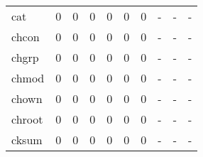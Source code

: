 \begin{longtable}{lp{1.3cm}p{1.3cm}p{1.3cm}p{1.3cm}p{1.3cm}p{1.3cm}p{1.3cm}p{1.3cm}p{1.3cm}}
cat       &                      0 &                                             0 &                                            0 &                                           0 &                                            0 &                                          0 &                                    - &                                      - &                                    - \\
chcon     &                      0 &                                             0 &                                            0 &                                           0 &                                            0 &                                          0 &                                    - &                                      - &                                    - \\
chgrp     &                      0 &                                             0 &                                            0 &                                           0 &                                            0 &                                          0 &                                    - &                                      - &                                    - \\
chmod     &                      0 &                                             0 &                                            0 &                                           0 &                                            0 &                                          0 &                                    - &                                      - &                                    - \\
chown     &                      0 &                                             0 &                                            0 &                                           0 &                                            0 &                                          0 &                                    - &                                      - &                                    - \\
chroot    &                      0 &                                             0 &                                            0 &                                           0 &                                            0 &                                          0 &                                    - &                                      - &                                    - \\
cksum     &                      0 &                                             0 &                                            0 &                                           0 &                                            0 &                                          0 &                                    - &                                      - &                                    - \\

\end{longtable}
